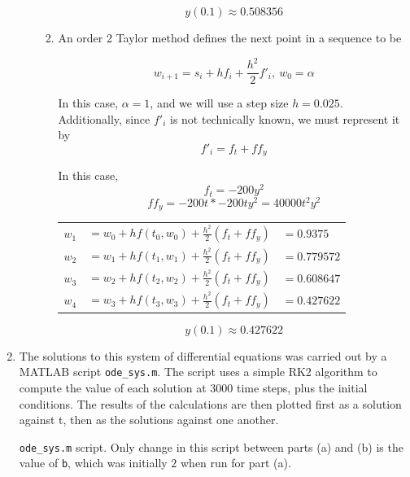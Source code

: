 \documentclass[11pt]{article}
\begin{document}
\begin{enumerate}
\begin{enumerate}
\begin{enumerate}
\begin{tabular}{llll}
			\end{tabular}

			\[y(0.1) \approx 0.508356\]

			\medskip

			\item An order 2 Taylor method defines the next point in a sequence to be

			\[
			w_{i+1} = s_i + hf_i + \frac{h^2}{2}f'_i,\ w_0 = \alpha
			\]

			In this case, $\alpha = 1$, and we will use a step size $h=0.025$. Additionally, since $f'_i$ is not technically known, we must represent it by
			\[
			f'_i = f_t + ff_y
			\]

			In this case,
			\[f_t = -200y^2\]
			\[ff_y = -200t * -200ty^2 = 40000t^2y^2\]

			\medskip

			\begin{tabular}{lll}

			$w_1$ & $= w_0 + hf(t_0,w_0) + \frac{h^2}{2}(f_t+ff_y)$ & $= 0.9375$ \\
			$w_2$ & $= w_1 + hf(t_1,w_1) + \frac{h^2}{2}(f_t+ff_y)$ & $= 0.779572$ \\
			$w_3$ & $= w_2 + hf(t_2,w_2) + \frac{h^2}{2}(f_t+ff_y)$ & $= 0.608647$ \\
			$w_4$ & $= w_3 + hf(t_3,w_3) + \frac{h^2}{2}(f_t+ff_y)$ & $= 0.427622$

			\end{tabular}

			\[y(0.1) \approx 0.427622\]

			\medskip

		\end{enumerate}

	\end{enumerate}

	\item The solutions to this system of differential equations was carried out by a MATLAB script \texttt{ode\_sys.m}. The script uses a simple RK2 algorithm to compute the value of each solution at 3000 time steps, plus the initial conditions. The results of the calculations are then plotted first as a solution against t, then as the solutions against one another.

	\begin{center}
	\texttt{ode\_sys.m} script. Only change in this script between parts (a) and (b) is the value of \texttt{b}, which was initially $2$ when run for part (a).
	
	\end{center}


\end{enumerate}
\end{document}

